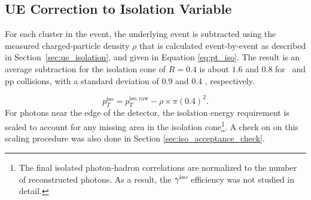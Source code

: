 
\subsection{UE Correction to Isolation Variable}
\label{sec:ue_correction_isolation}
For each cluster in the event, the underlying event is subtracted using the measured charged-particle density $\rho$ that is calculated event-by-event as described in Section~\ref{sec:ue_isolation}, and given in Equation \ref{eq:pt_iso}. The result is an average subtraction for the isolation cone of {$R=0.4$} is about {$1.6$ \GeVc} and {$0.8$ \GeVc} for \pPb~and pp collisions, with a standard deviation of {0.9 \GeVc} and {0.4 \GeVc}, respectively.  



\begin{equation}
p_T^\mathrm{iso} = p_T^\mathrm{iso,raw} - \rho\times\pi(0.4)^{2}.
\label{eq:pt_iso}
\end{equation}
For photons near the edge of the detector, the isolation energy requirement is scaled to account for any missing area in the isolation cone\footnote{The final isolated photon-hadron correlations are normalized to the number of reconstructed photons. As a result, the $\gamma^\mathrm{iso}$ efficiency was not studied in detail.}. A check on on this scaling procedure was also done in Section \ref{sec:iso_acceptance_check}. 

